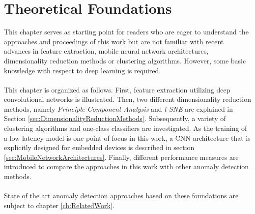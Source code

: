 \chapter{Theoretical Foundations}  
\label{ch:TheoreticalFoundations}
This chapter serves as starting point for readers who are eager to understand the approaches and proceedings of this work but are not familiar with recent advances in feature extraction, mobile neural network architectures, dimensionality reduction methods or clustering algorithms. However, some basic knowledge with respect to deep learning is required.\\
\\
This chapter is organized as follows. First, feature extraction utilizing deep convolutional networks is illustrated. Then, two different dimensionality reduction methods, namely \textit{Principle Component Analysis} and \textit{t-SNE} are explained in Section \ref{sec:DimensionalityReductionMethods}. Subsequently, a variety of clustering algorithms and one-class classifiers are investigated. As the training of a low latency model is one point of focus in this work, a CNN architecture that is explicitly designed for embedded devices is described in section \ref{sec:MobileNetworkArchitectures}. Finally, different performance measures are introduced to compare the approaches in this work with other anomaly detection methods.\\
\\
State of the art anomaly detection approaches based on these foundations are subject to chapter \ref{ch:RelatedWork}. 


